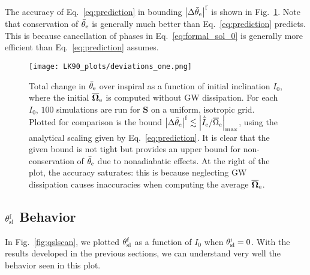 \documentclass[
        twocolumn,
        twocolappendix
    ]{aastex63}
\newcommand*{\abs}[1]{\left|#1\right|}
\renewcommand*{\bm}[1]{\boldsymbol{\mathbf{#1}}}
\begin{document}
The accuracy of Eq.~\eqref{eq:prediction} in bounding $\abs{\Delta
\bar{\theta}_{\rm e}}^{\rm f}$ is shown in Fig.~\ref{fig:deviations}. Note that
conservation of $\bar{\theta}_{\rm e}$ is generally much better than
Eq.~\eqref{eq:prediction} predicts. This is because cancellation of phases in
Eq.~\eqref{eq:formal_sol_0} is generally more efficient than
Eq.~\eqref{eq:prediction} assumes.
\begin{figure}
    \centering
    \texttt{[image: LK90\_plots/deviations\_one.png]}
    \caption{Total change in $\bar{\theta}_{\rm e}$ over inspiral as a function of
    initial inclination $I_0$, where the initial $\bm{\overline{\Omega}}_{\rm
    e}$ is computed without GW dissipation. For each $I_0$, $100$ simulations
    are run for $\bm{S}$ on a uniform, isotropic grid. Plotted for comparison is
    the bound $\abs{\Delta \bar{\theta}_{\rm e}}^{\rm f} \lesssim
    \abs{\dot{\bar{I}}_{\rm e} /
    \overline{\Omega}_{\rm e}}_{\max}$, using the analytical scaling given by
    Eq.~\eqref{eq:prediction}. It is clear that the given bound is not tight but
    provides an upper bound for non-conservation of $\bar{\theta}_{\rm e}$ due to
    nonadiabatic effects. At the right of the plot, the accuracy saturates: this
    is because neglecting GW dissipation causes inaccuracies when computing the
    average $\bm{\overline{\Omega}}_{\rm e}$.}\label{fig:deviations}
\end{figure}

\subsection{$\theta_{\rm sl}^{\rm f}$ Behavior}\label{eq:effect}

In Fig.~\ref{fig:qslscan}, we plotted $\theta_{\rm sl}^{\rm f}$ as a function of
$I_0$ when $\theta_{\rm sl}^{\rm i} = 0$. With the results developed in the
previous sections, we can understand very well the behavior seen in this plot.
\end{document}
